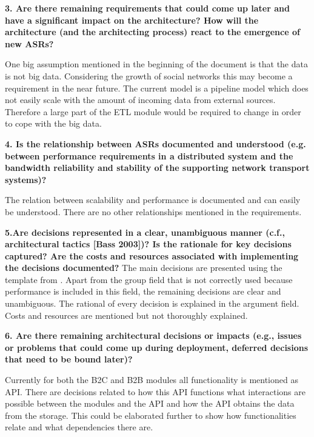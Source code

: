 \vspace{.5cm}
\textbf {3. Are there remaining requirements that could come up later and have a significant impact on the architecture? How will the architecture (and the architecting process) react to the emergence of new ASRs?}

One big assumption mentioned in the beginning of the document is that the data is not big data. Considering the growth of social networks this may become a requirement in the near future. The current model is a pipeline model which does not easily scale with the amount of incoming data from external sources. Therefore a large part of the ETL module would be required to change in order to cope with the big data.

\vspace{.5cm}
\textbf {4. Is the relationship between ASRs documented and understood (e.g. between performance requirements in a distributed system and the bandwidth reliability and stability of the supporting network transport systems)?}

The relation between scalability and performance is documented and can easily be understood. There are no other relationships mentioned in the requirements.

\vspace{.5cm}
\textbf{5.Are decisions represented in a clear, unambiguous manner (c.f., architectural tactics [Bass 2003])? 
         Is the rationale for key decisions captured?
         Are the costs and resources associated with implementing the decisions documented?}
The main decisions are presented using the template from \cite{tyree}. Apart from the group field that is not correctly used because performance is included in this field, the remaining decisions are clear and unambiguous. The rational of every decision is explained in the argument field. Costs and resources are mentioned but not thoroughly explained.

\vspace{.5cm}
\textbf {6. Are there remaining architectural decisions or impacts (e.g., issues or problems that could come up during deployment, deferred decisions that need to be bound later)?}

Currently for both the B2C and B2B modules all functionality is mentioned as API. There are decisions related to how this API functions what interactions are possible between the modules and the API and how the API obtains the data from the storage. This could be elaborated further to show how functionalities relate and what dependencies there are.


